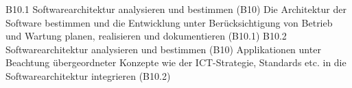 \templateCard
  {B10.1}
  {Softwarearchitektur analysieren und bestimmen (B10)}
  {Die Architektur der Software bestimmen und die Entwicklung unter Berücksichtigung von Betrieb und Wartung planen, realisieren und dokumentieren (B10.1)}
\templateCard
  {B10.2}
  {Softwarearchitektur analysieren und bestimmen (B10)}
  {Applikationen unter Beachtung übergeordneter Konzepte wie der ICT-Strategie, Standards etc. in die Softwarearchitektur integrieren (B10.2)}
